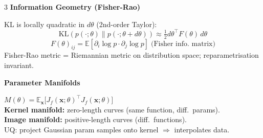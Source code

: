 \documentclass[8pt,a4paper]{extarticle}
\newcommand{\sub}[1]{%
  \vspace{1pt}%
  {\footnotesize\textbf{#1}}%
  \vspace{0.5pt}%
}
\newcommand{\E}{\mathbb{E}}
\newcommand{\KL}{\mathrm{KL}}
\newcommand{\bx}{\mathbf{x}}
\begin{document}
\begin{multicols}{3}
\sub{Information Geometry (Fisher-Rao)}

KL is locally quadratic in $d\theta$ (2nd-order Taylor):
\[
  \KL(p(\cdot;\theta)\|p(\cdot;\theta{+}d\theta))\approx\tfrac{1}{2}d\theta^\top F(\theta)\,d\theta
\]
\[
  F(\theta)_{ij}=\E\!\left[\partial_i\log p\cdot\partial_j\log p\right]\;\text{(Fisher info.\ matrix)}
\]
Fisher-Rao metric = Riemannian metric on distribution space; reparametrisation invariant.

\sub{Parameter Manifolds}

$M(\theta)=\E_\bx\!\bigl[J_f(\bx;\theta)^\top J_f(\bx;\theta)\bigr]$\\
\textbf{Kernel manifold:} zero-length curves (same function, diff.\ params).\\
\textbf{Image manifold:} positive-length curves (diff.\ functions).\\
UQ: project Gaussian param samples onto kernel $\Rightarrow$ interpolates data.

\end{multicols}

\newpage
\end{document}
